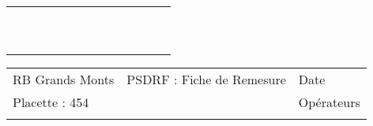 \documentclass[a4paper, landscape]{article}\usepackage[]{graphicx}\usepackage[]{color}
\begin{document}
{\begin{tabular}{|p{1cm}|p{2cm}|p{1.6cm}|p{1.6cm}|p{1.6cm}|p{1.6cm}|p{1.5cm}|p{1.5cm}|p{1.5cm}|p{1.5cm}|p{1.5cm}|p{7.5cm}|p{5cm}|}
   \rowcolor[gray]{0.95} \hline
 &  &  &  &  &  &  &  &  &  &  &  &  \\ 
   \hline
 &  &  &  &  &  &  &  &  &  &  &  &  \\ 
   \rowcolor[gray]{0.95} \hline
 &  &  &  &  &  &  &  &  &  &  &  &  \\ 
   \hline
 &  &  &  &  &  &  &  &  &  &  &  &  \\ 
   \rowcolor[gray]{0.95} \hline
 &  &  &  &  &  &  &  &  &  &  &  &  \\ 
   \hline
 &  &  &  &  &  &  &  &  &  &  &  &  \\ 
   \rowcolor[gray]{0.95} \hline
 &  &  &  &  &  &  &  &  &  &  &  &  \\ 
   \hline
 &  &  &  &  &  &  &  &  &  &  &  &  \\ 
   \rowcolor[gray]{0.95} \hline
 &  &  &  &  &  &  &  &  &  &  &  &  \\ 
   \hline
 &  &  &  &  &  &  &  &  &  &  &  &  \\ 
   \rowcolor[gray]{0.95} \hline
 &  &  &  &  &  &  &  &  &  &  &  &  \\ 
   \hline
\end{tabular}
}

\begin{tabular}{p{10cm}p{10cm}p{8cm}}
  RB Grands Monts & PSDRF : Fiche de Remesure & Date \\ 
  Placette : 454 &  & Opérateurs \\ 
   &  &  \\ 
  \end{tabular}
\end{document}
